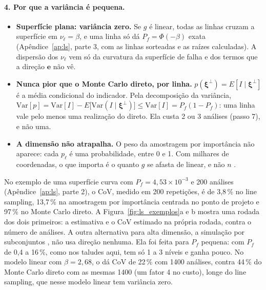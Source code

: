 \documentclass[11pt,a4paper]{article}
\newcommand{\xib}{\bm\xi}
\begin{document}
\paragraph{4. Por que a variância é pequena.}
\begin{itemize}
  \item \textbf{Superfície plana: variância zero.} Se $g$ é linear, todas as linhas cruzam a superfície em
    $\nu_\ell = \beta$, e uma linha só dá $P_f = \Phi(-\beta)$ exata (Apêndice~\ref{ap:ls}, parte 3, com as linhas sorteadas e as raízes
    calculadas). A dispersão dos
    $\nu_\ell$ vem só da curvatura da superfície de falha e dos termos que a direção $\bm e$ não vê.
  \item \textbf{Nunca pior que o Monte Carlo direto, por linha.} $p(\xib^\perp) = E[I \mid \xib^\perp]$ é a média
    condicional do indicador. Pela decomposição da variância,
    $\mathrm{Var}[p] = \mathrm{Var}[I] - E\big[\mathrm{Var}(I \mid \xib^\perp)\big] \le \mathrm{Var}[I] = P_f(1 - P_f)$:
    uma linha vale pelo menos uma realização do direto. Ela custa 2 ou 3 análises (passo 7), e não uma.
  \item \textbf{A dimensão não atrapalha.} O peso da amostragem por importância não aparece: cada $p_\ell$ é uma
    probabilidade, entre 0 e 1. Com milhares de coordenadas, o que importa é o quanto $g$ se afasta de linear, e não $n$
    \citep{koutsourelakis2004, schueller2004}.
\end{itemize}
No exemplo de uma superfície curva com $P_f = 4{,}53\times10^{-3}$ e 200 análises (Apêndice~\ref{ap:ls}, parte 2), o
CoV, medido em 200 repetições, é de 3,8\,\% no line sampling, 13,7\,\% na amostragem por importância centrada no ponto de
projeto e 97\,\% no Monte Carlo direto. A Figura~\ref{fig:ls_exemplos}a e b mostra uma rodada dos dois primeiros: a
estimativa e o CoV estimado na própria rodada, contra o número de análises. A outra alternativa para alta dimensão, a simulação por
subconjuntos \citep{au2001}, não usa direção nenhuma. Ela foi feita para $P_f$ pequena: com $P_f$ de 0,4 a 16\,\%, como
nos taludes aqui, tem só 1 a 3 níveis e ganha pouco. No modelo linear com $\beta = 2{,}68$, o
 dá CoV de 22\,\% com 1400 análises, contra 44\,\% do Monte Carlo direto com as mesmas 1400
(um fator 4 no custo), longe do line sampling, que nesse modelo linear tem variância zero.
\end{document}
